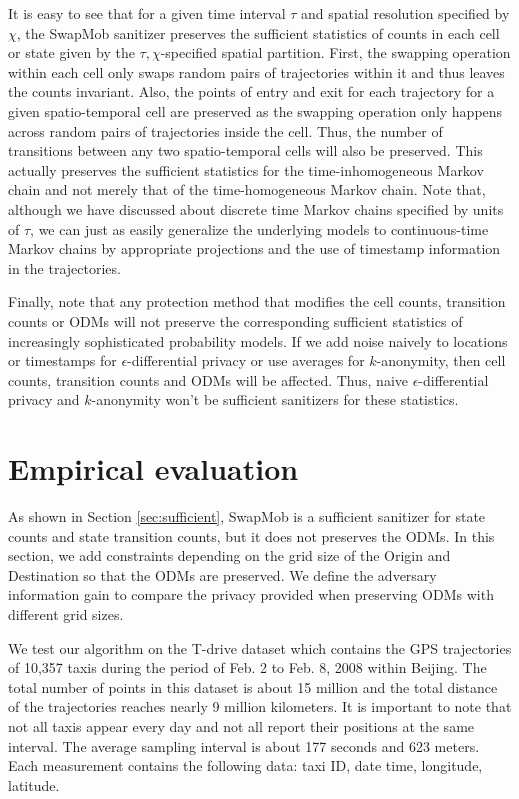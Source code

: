 \documentclass[times,twocolumn,final,authoryear]{elsarticle}
\begin{document}
It is easy to see that for a given time interval $\tau$ and spatial resolution specified by $\chi$, the SwapMob sanitizer preserves the sufficient statistics of counts in each cell or state given by the $\tau,\chi$-specified spatial partition.  
First, the swapping operation within each cell only swaps random pairs of trajectories within it and thus leaves the counts invariant.  
Also, the points of entry and exit for each trajectory for a given spatio-temporal cell are preserved as the swapping operation only happens across random pairs of trajectories inside the cell.  
Thus, the number of transitions between any two spatio-temporal cells will also be preserved.  
This actually preserves the sufficient statistics for the time-inhomogeneous Markov chain and not merely that of the time-homogeneous Markov chain. 
Note that, although we have discussed about discrete time Markov chains specified by units of $\tau$, we can just as easily generalize the underlying models to continuous-time Markov chains by appropriate projections and the use of timestamp information in the trajectories.   

Finally, note that any protection method that modifies the cell counts, transition counts or ODMs will not preserve the corresponding sufficient statistics of increasingly sophisticated probability models.  
If we add noise naively to locations or timestamps for $\epsilon$-differential privacy or use averages for $k$-anonymity, then cell counts, transition counts and ODMs will be affected.  Thus, naive $\epsilon$-differential privacy and $k$-anonymity won't be sufficient sanitizers for these statistics.

\section{Empirical evaluation}\label{Sec:evaluation}
As shown in Section \ref{sec:sufficient}, SwapMob is a sufficient sanitizer for state counts and state transition counts, but it does not preserves the ODMs.
In this section, we add constraints depending on the grid size of the Origin and Destination so that the ODMs are preserved. 
We define the adversary information gain to compare the privacy provided when preserving ODMs with different grid sizes.

We test our algorithm on the T-drive dataset
\citep{Yuan2010,Yuan2011} which contains the GPS trajectories of
10,357 taxis during the period of Feb. 2 to Feb. 8, 2008 within
Beijing. The total number of points in this dataset is about 15
million and the total distance of the trajectories reaches nearly 9
million kilometers. It is important to note that not all taxis appear
every day and not all report their positions at the same interval. The
average sampling interval is about 177 seconds and 623 meters. Each
measurement contains the following data: taxi ID, date time,
longitude, latitude.
\end{document}

